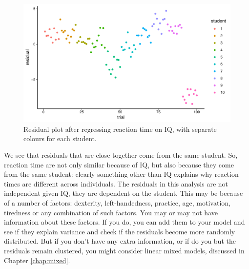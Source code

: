 \documentclass[]{book}\usepackage[]{graphicx}\usepackage[]{color}
\makeatletter
\def\maxwidth{ %
  \ifdim\Gin@nat@width>\linewidth
    \linewidth
  \else
    \Gin@nat@width
  \fi
}
\newenvironment{knitrout}{}{} %
\makeatother
\begin{document}
\begin{knitrout}
\color{fgcolor}\begin{figure}

{\centering \includegraphics[width=\maxwidth]{figure/ass_9-1} 

}

\caption[Residual plot after regressing reaction time on IQ, with separate colours for each student]{Residual plot after regressing reaction time on IQ, with separate colours for each student.}\label{fig:ass_9}
\end{figure}


\end{knitrout}

We see that residuals that are close together come from the same student. So, reaction time are not only similar because of IQ, but also because they come from the same student: clearly something other than IQ explains why reaction times are different across individuals. The residuals in this analysis are not independent given IQ, they are dependent on the student. This may be because of a number of factors: dexterity, left-handedness, practice, age, motivation, tiredness or any combination of such factors. You may or may not have information about these factors. If you do, you can add them to your model and see if they explain variance and check if the residuals become more randomly distributed. But if you don't have any extra information, or if do you but the residuals remain clustered, you might consider linear mixed models, discussed in Chapter \ref{chap:mixed}.
\end{document}
